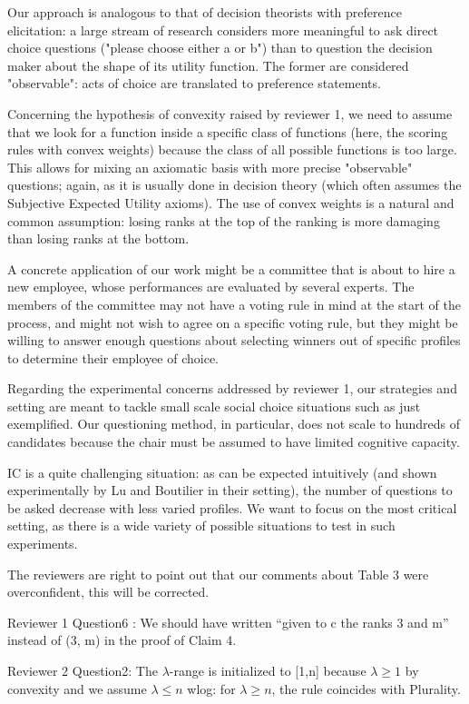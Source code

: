 \documentclass[version=3.21, pagesize, twoside=off, bibliography=totoc, DIV=calc, fontsize=12pt, a4paper]{scrartcl}
\begin{document}
Our approach is analogous to that of decision theorists with preference elicitation: a large stream of research considers more meaningful to ask direct choice questions ("please choose either a or b") than to question the decision maker about the shape of its utility function. The former are considered "observable": acts of choice are translated to preference statements.

Concerning the hypothesis of convexity raised by reviewer 1, we need to assume that we look for a function inside a specific class of functions (here, the scoring rules with convex weights) because the class of all possible functions is too large. This allows for mixing an axiomatic basis with more precise "observable" questions; again, as it is usually done in decision theory (which often assumes the Subjective Expected Utility axioms). The use of convex weights is a natural and common assumption: losing ranks at the top of the ranking is more damaging than losing ranks at the bottom.

A concrete application of our work might be a committee that is about to hire a new employee, whose performances are evaluated by several experts. The members of the committee may not have a voting rule in mind at the start of the process, and might not wish to agree on a specific voting rule, but they might be willing to answer enough questions about selecting winners out of specific profiles to determine their employee of choice.

Regarding the experimental concerns addressed by reviewer 1, our strategies and setting are meant to tackle small scale social choice situations such as just exemplified. Our questioning method, in particular, does not scale to hundreds of candidates because the chair must be assumed to have limited cognitive capacity.

IC is a quite challenging situation: as can be expected intuitively (and shown experimentally by Lu and Boutilier in their setting), the number of questions to be asked decrease with less varied profiles. We want to focus on the most critical setting, as there is a wide variety of possible situations to test in such experiments.

The reviewers are right to point out that our comments about Table 3 were overconfident, this will be corrected.

Reviewer 1 Question6 : We should have written “given to c the ranks 3 and m” instead of (3, m) in the proof of Claim 4.

Reviewer 2 Question2: The $\lambda$-range is initialized to [1,n] because $\lambda \geq1$ by convexity and we assume $\lambda \leq n$ wlog: for $\lambda \geq n$, the rule coincides with Plurality.
\end{document}
